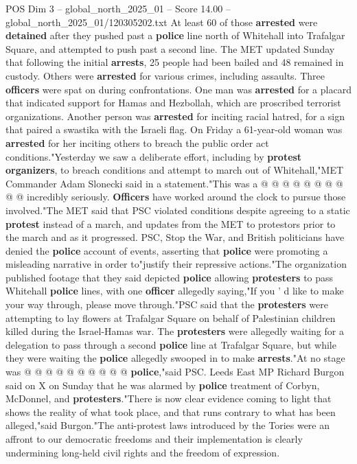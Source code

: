 \begin{textsample}{POS Dim 3 – global\_north\_2025\_01 – Score 14.00 – global\_north\_2025\_01/120305202.txt}
At least 60 of those \textbf{arrested} were \textbf{detained} after they pushed past a \textbf{police} line north of Whitehall into Trafalgar Square, and attempted to push past a second line.
The MET updated Sunday that following the initial \textbf{arrests}, 25 people had been bailed and 48 remained in custody.
Others were \textbf{arrested} for various crimes, including assaults.
Three \textbf{officers} were spat on during confrontations.
One man was \textbf{arrested} for a placard that indicated support for Hamas and Hezbollah, which are proscribed terrorist organizations.
Another person was \textbf{arrested} for inciting racial hatred, for a sign that paired a swastika with the Israeli flag.
On Friday a 61-year-old woman was \textbf{arrested} for her inciting others to breach the public order act conditions."Yesterday we saw a deliberate effort, including by \textbf{protest} \textbf{organizers}, to breach conditions and attempt to march out of Whitehall,"MET Commander Adam Slonecki said in a statement."This was a @ @ @ @ @ @ @ @ @ @ incredibly seriously. \textbf{Officers} have worked around the clock to pursue those involved."The MET said that PSC violated conditions despite agreeing to a static \textbf{protest} instead of a march, and updates from the MET to protestors prior to the march and as it progressed.
PSC, Stop the War, and British politicians have denied the \textbf{police} account of events, asserting that \textbf{police} were promoting a misleading narrative in order to"justify their repressive actions."The organization published footage that they said depicted \textbf{police} allowing \textbf{protesters} to pass Whitehall \textbf{police} lines, with one \textbf{officer} allegedly saying,"If you ' d like to make your way through, please move through."PSC said that the \textbf{protesters} were attempting to lay flowers at Trafalgar Square on behalf of Palestinian children killed during the Israel-Hamas war.
The \textbf{protesters} were allegedly waiting for a delegation to pass through a second \textbf{police} line at Trafalgar Square, but while they were waiting the \textbf{police} allegedly swooped in to make \textbf{arrests}."At no stage was @ @ @ @ @ @ @ @ @ @ \textbf{police},"said PSC.
Leeds East MP Richard Burgon said on X on Sunday that he was alarmed by \textbf{police} treatment of Corbyn, McDonnel, and \textbf{protesters}."There is now clear evidence coming to light that shows the reality of what took place, and that runs contrary to what has been alleged,"said Burgon."The anti-protest laws introduced by the Tories were an affront to our democratic freedoms and their implementation is clearly undermining long-held civil rights and the freedom of expression.

\end{textsample}

